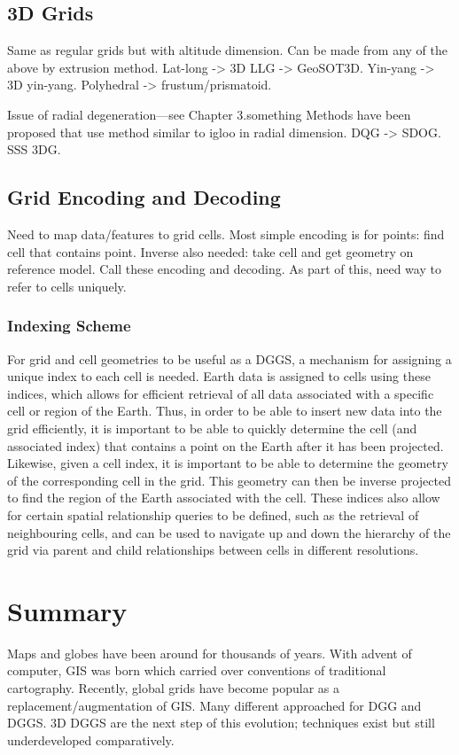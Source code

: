 \subsection{3D Grids}
Same as regular grids but with altitude dimension.
Can be made from any of the above by extrusion method.
Lat-long -> 3D LLG -> GeoSOT3D.
Yin-yang -> 3D yin-yang.
Polyhedral -> frustum/prismatoid.
\cite{yoo2019concept}
\cite{sun20153d}
\cite{yoshida2004application}
\cite{kageyama2005geodynamo}
\cite{tackley2008modelling}


Issue of radial degeneration---see Chapter 3.something
Methods have been proposed that use method similar to igloo in radial dimension.
DQG -> SDOG.
SSS 3DG.
\cite{yu2009sdog}
\cite{yu2012large-scale}
\cite{yu2012lithosphere}
\cite{gang2013sphere} 
\cite{wang2013global}


\subsection{Grid Encoding and Decoding}
Need to map data/features to grid cells.
Most simple encoding is for points: find cell that contains point.
Inverse also needed: take cell and get geometry on reference model.
Call these encoding and decoding.
As part of this, need way to refer to cells uniquely.
\cite{du2018duality}


\subsubsection{Indexing Scheme} \label{sec::dggs:indexing}
For grid and cell geometries to be useful as a DGGS, a mechanism for assigning a unique index to each cell is needed.
Earth data is assigned to cells using these indices, which allows for efficient retrieval of all data associated with a specific cell or region of the Earth.
Thus, in order to be able to insert new data into the grid efficiently, it is important to be able to quickly determine the cell (and associated index) that contains a point on the Earth after it has been projected.
Likewise, given a cell index, it is important to be able to determine the geometry of the corresponding cell in the grid.
This geometry can then be inverse projected to find the region of the Earth associated with the cell.
These indices also allow for certain spatial relationship queries to be defined, such as the retrieval of neighbouring cells, and can be used to navigate up and down the hierarchy of the grid via parent and child relationships between cells in different resolutions.
\cite{yu2009coding}
\cite{vince2006indexing}
\cite{tong2013efficient}
\cite{mahdavi2015categorization}


\section{Summary}
Maps and globes have been around for thousands of years.
With advent of computer, GIS was born which carried over conventions of traditional cartography.
Recently, global grids have become popular as a replacement/augmentation of GIS.
Many different approached for DGG and DGGS.
3D DGGS are the next step of this evolution; techniques exist but still underdeveloped comparatively.
